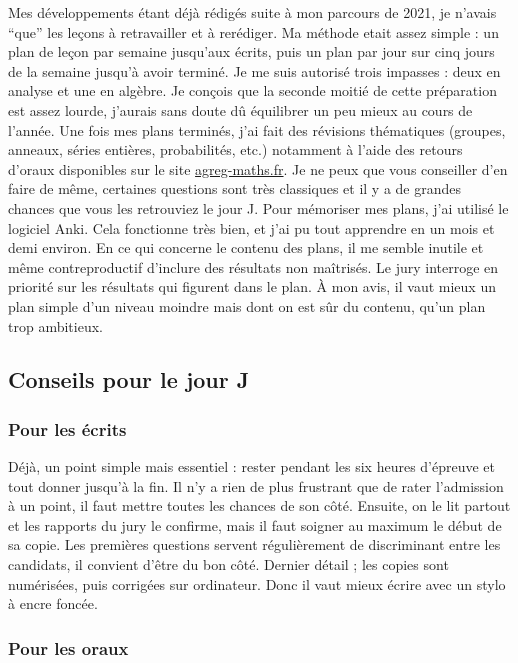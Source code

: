   Mes développements étant déjà rédigés suite à mon parcours de 2021, je n'avais ``que'' les leçons à retravailler et à rerédiger.
  \newpar
  Ma méthode etait assez simple : un plan de leçon par semaine jusqu'aux écrits, puis un plan par jour sur cinq jours de la semaine jusqu'à avoir terminé. Je me suis autorisé trois impasses : deux en analyse et une en algèbre. Je conçois que la seconde moitié de cette préparation est assez lourde, j'aurais sans doute dû équilibrer un peu mieux au cours de l'année. Une fois mes plans terminés, j'ai fait des révisions thématiques (groupes, anneaux, séries entières, probabilités, etc.) notamment à l'aide des retours d'oraux disponibles sur le site \href{https://agreg-maths.fr}{agreg-maths.fr}. Je ne peux que vous conseiller d'en faire de même, certaines questions sont très classiques et il y a de grandes chances que vous les retrouviez le jour J.
  \newpar
  Pour mémoriser mes plans, j'ai utilisé le logiciel Anki. Cela fonctionne très bien, et j'ai pu tout apprendre en un mois et demi environ.
  \newpar
  En ce qui concerne le contenu des plans, il me semble inutile et même contreproductif d'inclure des résultats non maîtrisés. Le jury interroge en priorité sur les résultats qui figurent dans le plan. À mon avis, il vaut mieux un plan simple d'un niveau moindre mais dont on est sûr du contenu, qu'un plan trop ambitieux.

  \subsection{Conseils pour le jour J}

  \subsubsection{Pour les écrits}

  Déjà, un point simple mais essentiel : rester pendant les six heures d'épreuve et tout donner jusqu'à la fin. Il n'y a rien de plus frustrant que de rater l'admission à un point, il faut mettre toutes les chances de son côté.
  \newpar
  Ensuite, on le lit partout et les rapports du jury le confirme, mais il faut soigner au maximum le début de sa copie. Les premières questions servent régulièrement de discriminant entre les candidats, il convient d'être du bon côté.
  \newpar
  Dernier détail ; les copies sont numérisées, puis corrigées sur ordinateur. Donc il vaut mieux écrire avec un stylo à encre foncée.

  \subsubsection{Pour les oraux}

